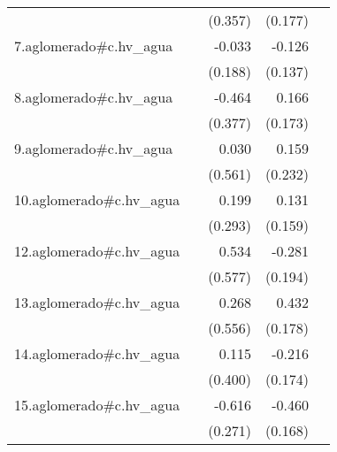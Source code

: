 {\begin{longtable}{l*{4}{D{.}{.}{-1}}}
            &                     &     (0.357)         &     (0.177)         &                     \\
\addlinespace
7.aglomerado#c.hv\_agua&                     &      -0.033         &      -0.126         &                     \\
            &                     &     (0.188)         &     (0.137)         &                     \\
\addlinespace
8.aglomerado#c.hv\_agua&                     &      -0.464         &       0.166         &                     \\
            &                     &     (0.377)         &     (0.173)         &                     \\
\addlinespace
9.aglomerado#c.hv\_agua&                     &       0.030         &       0.159         &                     \\
            &                     &     (0.561)         &     (0.232)         &                     \\
\addlinespace
10.aglomerado#c.hv\_agua&                     &       0.199         &       0.131         &                     \\
            &                     &     (0.293)         &     (0.159)         &                     \\
\addlinespace
12.aglomerado#c.hv\_agua&                     &       0.534         &      -0.281         &                     \\
            &                     &     (0.577)         &     (0.194)         &                     \\
\addlinespace
13.aglomerado#c.hv\_agua&                     &       0.268         &       0.432\sym{*}  &                     \\
            &                     &     (0.556)         &     (0.178)         &                     \\
\addlinespace
14.aglomerado#c.hv\_agua&                     &       0.115         &      -0.216         &                     \\
            &                     &     (0.400)         &     (0.174)         &                     \\
\addlinespace
15.aglomerado#c.hv\_agua&                     &      -0.616\sym{*}  &      -0.460\sym{**} &                     \\
            &                     &     (0.271)         &     (0.168)         &                     \\

\end{longtable}}
